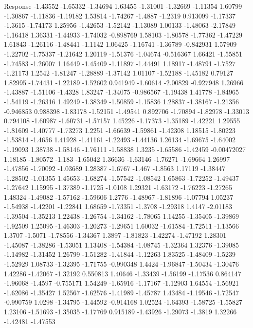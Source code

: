 \documentclass[9pt]{article}
\theoremstyle{plain}
\theoremstyle{definition}
\theoremstyle{remark}
\numberwithin{equation}{section}
\begin{document}
Response
-1.43552
-1.65332
-1.34694
1.63455
-1.31001
-1.32669
-1.11354
1.60799
-1.30867
-1.11836
-1.19182
1.53814
-1.74267
-1.4887
-1.2319
0.913099
-1.17337
-1.3615
-1.74173
1.25956
-1.42653
-1.52142
-1.13089
1.00133
-1.48063
-2.17849
-1.16418
1.36331
-1.44933
-1.74032
-0.898769
1.58103
-1.80578
-1.77362
-1.47229
1.61843
-1.26116
-1.48441
-1.1142
1.06425
-1.16741
-1.36789
-0.842931
1.57909
-1.22702
-1.75337
-1.21642
1.20119
-1.51376
-1.04674
-0.516367
1.66421
-1.55851
-1.74583
-1.26007
1.16449
-1.45409
-1.11897
-1.44491
1.18917
-1.48791
-1.7527
-1.21173
1.2542
-1.81247
-1.28889
-1.37142
1.01107
-1.52188
-1.45182
0.79127
1.82995
-1.74431
-1.22189
-1.52602
0.941949
-1.60614
-2.00829
-0.927948
1.26966
-1.43887
-1.51106
-1.4328
1.83247
-1.34075
-0.986567
-1.19438
1.41778
-1.84965
-1.54119
-1.26316
1.49249
-1.38349
-1.50859
-1.15836
1.28837
-1.38167
-1.21356
-0.946853
0.988398
-1.83178
-1.52151
-1.49541
0.892706
-1.70894
-1.82978
-1.33013
0.794108
-1.60987
-1.60731
-1.57157
1.45226
-1.17373
-1.35189
-1.42221
1.29555
-1.81609
-1.40777
-1.73273
1.2251
-1.66639
-1.59861
-1.42308
1.18515
-1.80223
-1.53814
-1.4656
1.41928
-1.41161
-1.22493
-1.44136
1.26134
-1.69675
-1.64002
-1.19093
1.38738
-1.58146
-1.76111
-1.58838
1.3235
-1.65586
-1.42459
-0.00472027
1.18185
-1.80572
-1.183
-1.65042
1.36636
-1.63146
-1.76271
-1.69664
1.26997
-1.47856
-1.70092
-1.03689
1.28387
-1.6767
-1.467
-1.8563
1.17119
-1.38447
-1.28502
-1.01355
1.45653
-1.68274
-1.57542
-1.08542
1.65863
-1.72252
-1.49437
-1.27642
1.15995
-1.37389
-1.1725
-1.0108
1.29321
-1.63172
-1.76223
-1.27265
1.48324
-1.49082
-1.57162
-1.59606
1.2776
-1.48967
-1.81896
-1.07794
1.05237
-1.54938
-1.42201
-1.22841
1.68659
-1.73351
-1.3708
-1.29318
1.4147
-2.01183
-1.39504
-1.35213
1.22438
-1.26754
-1.34162
-1.78065
1.14255
-1.35405
-1.39869
-1.92509
1.25095
-1.46303
-1.20273
-1.29651
1.60032
-1.61584
-1.72511
-1.13566
1.3707
-1.5071
-1.78556
-1.34367
1.3897
-1.81823
-1.42274
-1.47192
1.28301
-1.45087
-1.38286
-1.53051
1.13408
-1.54384
-1.08745
-1.32364
1.32376
-1.39085
-1.14982
-1.31452
1.26799
-1.51282
-1.41844
-1.12263
1.83525
-1.48409
-1.5239
-1.52929
1.08733
-1.32395
-1.71755
-0.990348
1.4424
-1.96847
-1.50434
-1.30476
1.42286
-1.42067
-1.32192
0.550813
1.40646
-1.33439
-1.56199
-1.17536
0.864147
-1.96068
-1.4597
-0.755171
1.54249
-1.65916
-1.17167
-1.12903
1.64554
-1.56921
-1.62086
-1.35427
1.52567
-1.62576
-1.41989
-1.45787
1.43484
-1.19546
-1.72547
-0.990759
1.0298
-1.34795
-1.44592
-0.914168
1.02524
-1.64393
-1.58725
-1.55827
1.23106
-1.51693
-1.35035
-1.17769
0.915189
-1.43926
-1.29073
-1.3819
1.32266
-1.42481
-1.47553
\end{document}
